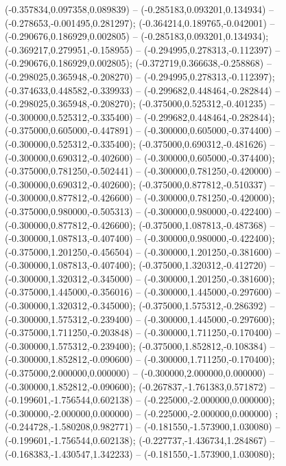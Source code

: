  (-0.357834,0.097358,0.089839) -- (-0.285183,0.093201,0.134934) -- (-0.278653,-0.001495,0.281297);
 (-0.364214,0.189765,-0.042001) -- (-0.290676,0.186929,0.002805) -- (-0.285183,0.093201,0.134934);
 (-0.369217,0.279951,-0.158955) -- (-0.294995,0.278313,-0.112397) -- (-0.290676,0.186929,0.002805);
 (-0.372719,0.366638,-0.258868) -- (-0.298025,0.365948,-0.208270) -- (-0.294995,0.278313,-0.112397);
 (-0.374633,0.448582,-0.339933) -- (-0.299682,0.448464,-0.282844) -- (-0.298025,0.365948,-0.208270);
 (-0.375000,0.525312,-0.401235) -- (-0.300000,0.525312,-0.335400) -- (-0.299682,0.448464,-0.282844);
 (-0.375000,0.605000,-0.447891) -- (-0.300000,0.605000,-0.374400) -- (-0.300000,0.525312,-0.335400);
 (-0.375000,0.690312,-0.481626) -- (-0.300000,0.690312,-0.402600) -- (-0.300000,0.605000,-0.374400);
 (-0.375000,0.781250,-0.502441) -- (-0.300000,0.781250,-0.420000) -- (-0.300000,0.690312,-0.402600);
 (-0.375000,0.877812,-0.510337) -- (-0.300000,0.877812,-0.426600) -- (-0.300000,0.781250,-0.420000);
 (-0.375000,0.980000,-0.505313) -- (-0.300000,0.980000,-0.422400) -- (-0.300000,0.877812,-0.426600);
 (-0.375000,1.087813,-0.487368) -- (-0.300000,1.087813,-0.407400) -- (-0.300000,0.980000,-0.422400);
 (-0.375000,1.201250,-0.456504) -- (-0.300000,1.201250,-0.381600) -- (-0.300000,1.087813,-0.407400);
 (-0.375000,1.320312,-0.412720) -- (-0.300000,1.320312,-0.345000) -- (-0.300000,1.201250,-0.381600);
 (-0.375000,1.445000,-0.356016) -- (-0.300000,1.445000,-0.297600) -- (-0.300000,1.320312,-0.345000);
 (-0.375000,1.575312,-0.286392) -- (-0.300000,1.575312,-0.239400) -- (-0.300000,1.445000,-0.297600);
 (-0.375000,1.711250,-0.203848) -- (-0.300000,1.711250,-0.170400) -- (-0.300000,1.575312,-0.239400);
 (-0.375000,1.852812,-0.108384) -- (-0.300000,1.852812,-0.090600) -- (-0.300000,1.711250,-0.170400);
 (-0.375000,2.000000,0.000000) -- (-0.300000,2.000000,0.000000) -- (-0.300000,1.852812,-0.090600);
 (-0.267837,-1.761383,0.571872) -- (-0.199601,-1.756544,0.602138) -- (-0.225000,-2.000000,0.000000);
 (-0.300000,-2.000000,0.000000) -- (-0.225000,-2.000000,0.000000) ;
 (-0.244728,-1.580208,0.982771) -- (-0.181550,-1.573900,1.030080) -- (-0.199601,-1.756544,0.602138);
 (-0.227737,-1.436734,1.284867) -- (-0.168383,-1.430547,1.342233) -- (-0.181550,-1.573900,1.030080);
